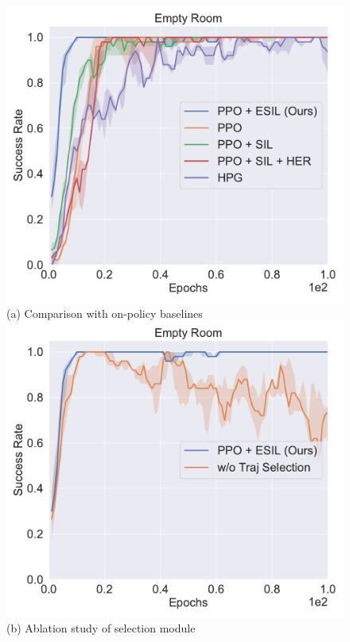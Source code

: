 \begin{figure}[H]
  \centering
  \includegraphics[width=\linewidth]{figures/chapter3/empty_room_baseline.pdf}
  ({a}) Comparison with on-policy baselines\hspace{3em} 
\endminipage
{}
  \centering
  \includegraphics[width=\linewidth]{figures/chapter3/empty_room_hs.pdf}
  ({b}) {Ablation study of selection module}
\endminipage\hfill

\end{figure}
